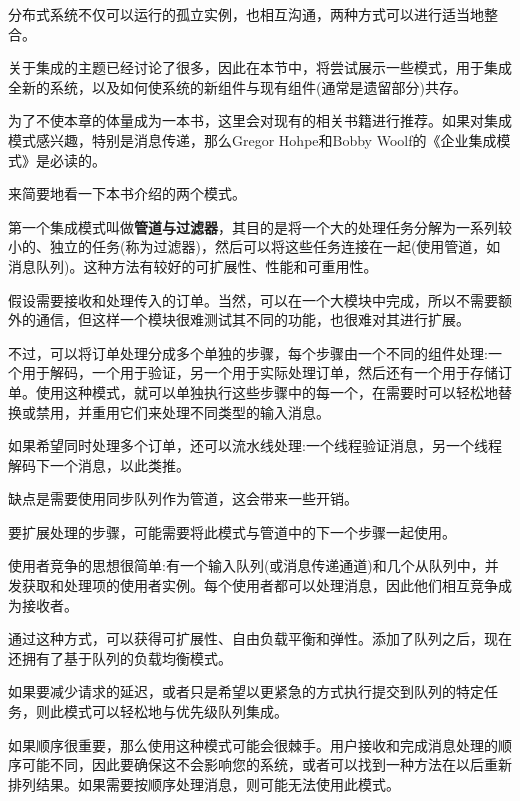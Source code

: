 

分布式系统不仅可以运行的孤立实例，也相互沟通，两种方式可以进行适当地整合。

关于集成的主题已经讨论了很多，因此在本节中，将尝试展示一些模式，用于集成全新的系统，以及如何使系统的新组件与现有组件(通常是遗留部分)共存。

为了不使本章的体量成为一本书，这里会对现有的相关书籍进行推荐。如果对集成模式感兴趣，特别是消息传递，那么Gregor Hohpe和Bobby Woolf的《企业集成模式》是必读的。

来简要地看一下本书介绍的两个模式。


第一个集成模式叫做\textbf{管道与过滤器}，其目的是将一个大的处理任务分解为一系列较小的、独立的任务(称为过滤器)，然后可以将这些任务连接在一起(使用管道，如消息队列)。这种方法有较好的可扩展性、性能和可重用性。

假设需要接收和处理传入的订单。当然，可以在一个大模块中完成，所以不需要额外的通信，但这样一个模块很难测试其不同的功能，也很难对其进行扩展。

不过，可以将订单处理分成多个单独的步骤，每个步骤由一个不同的组件处理:一个用于解码，一个用于验证，另一个用于实际处理订单，然后还有一个用于存储订单。使用这种模式，就可以单独执行这些步骤中的每一个，在需要时可以轻松地替换或禁用，并重用它们来处理不同类型的输入消息。

如果希望同时处理多个订单，还可以流水线处理:一个线程验证消息，另一个线程解码下一个消息，以此类推。

缺点是需要使用同步队列作为管道，这会带来一些开销。

要扩展处理的步骤，可能需要将此模式与管道中的下一个步骤一起使用。


使用者竞争的思想很简单:有一个输入队列(或消息传递通道)和几个从队列中，并发获取和处理项的使用者实例。每个使用者都可以处理消息，因此他们相互竞争成为接收者。

通过这种方式，可以获得可扩展性、自由负载平衡和弹性。添加了队列之后，现在还拥有了基于队列的负载均衡模式。

如果要减少请求的延迟，或者只是希望以更紧急的方式执行提交到队列的特定任务，则此模式可以轻松地与优先级队列集成。

\begin{tcolorbox}[colback=blue!5!white,colframe=blue!75!black, title=Note]
\hspace*{0.7cm}如果顺序很重要，那么使用这种模式可能会很棘手。用户接收和完成消息处理的顺序可能不同，因此要确保这不会影响您的系统，或者可以找到一种方法在以后重新排列结果。如果需要按顺序处理消息，则可能无法使用此模式。
\end{tcolorbox}

